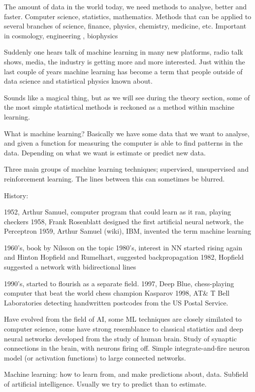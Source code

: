 The amount of data in the world today, we need methods to analyse, better and faster. 
Computer science, statistics, mathematics. Methods that can be applied to several branches of science, finance, physics, chemistry, medicine, etc. Important in cosmology, engineering , biophysics 

Suddenly one hears talk of machine learning in many new platforms, radio talk shows, media, the industry is getting more and more interested. Just within the last couple of years machine learning has become a term that people outside of data science and statistical physics known about. 

Sounds like a magical thing, but as we will see during the theory section, some of the most simple statistical methods is reckoned as a method within machine learning.  

What is machine learning? Basically we have some data that we want to analyse, and given a function for measuring the computer is able to find patterns in the data. Depending on what we want is estimate or predict new data. 

Three main groups of machine learning techniques; supervised, unsupervised and reinforcement learning. The lines between this can sometimes be blurred. 

History: 

1952, Arthur Samuel, computer program that could learn as it ran, playing checkers
1958, Frank Rosenblatt designed the first artificial neural network, the Perceptron
1959, Arthur Samuel (wiki), IBM, invented the term machine learning

1960's, book by Nilsson on the topic
1980's, interest in NN started rising again and Hinton Hopfield and Rumelhart, suggested backpropagation 
1982, Hopfield suggested a network with bidirectional lines

1990's, started to flourish as a separate field. 
1997, Deep Blue, chess-playing computer that beat the world chess champion Kasparov
1998, AT\& T Bell Laboratories detecting handwritten postcodes from the US Postal Service.

Have evolved from the field of AI, some ML techniques are closely similated to computer science, some have strong resemblance to classical statistics and deep neural networks developed from the study of human brain. Study of synaptic connections in the brain, with neurons firing off. Simple integrate-and-fire neuron model (or activation functions) to large connected networks.  

Machine learning: how to learn from, and make predictions about, data. \cite{mehta2019high}
Subfield of artificial intelligence. Usually we try to predict than to estimate.

